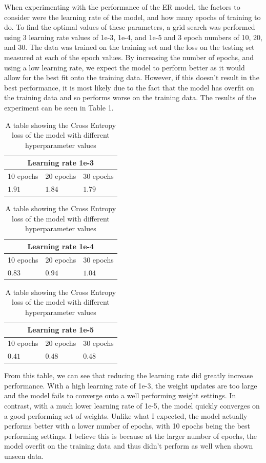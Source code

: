\documentclass[11pt]{article}
\begin{document}
When experimenting with the performance of the ER model, the factors to consider were the learning rate of the model, and how many epochs of training to do. To find the optimal values of these parameters, a grid search was performed using 3 learning rate values of 1e-3, 1e-4, and 1e-5 and 3 epoch numbers of 10, 20, and 30. The data was trained on the training set and the loss on the testing set measured at each of the epoch values. By increasing the number of epochs, and using a low learning rate, we expect the model to perform better as it would allow for the best fit onto the training data. However, if this doesn't result in the best performance, it is most likely due to the fact that the model has overfit on the training data and so performs worse on the training data. The results of the experiment can be seen in Table 1.

\begin{table}[H]
    \centering
    \caption{A table showing the Cross Entropy loss of the model with different hyperparameter values}
    \begin{tabularx}{0.48\textwidth}{|X X X|} 
      \hline
      \multicolumn{3}{|c|}{Learning rate 1e-3} \\ \hline 
      10 epochs & 20 epochs & 30 epochs \\ \hline
      $1.91$&$1.84$ &$1.79$ \\ \hline
    \end{tabularx}
    \begin{tabularx}{0.48\textwidth}{|X X X|} 
        \hline
        \multicolumn{3}{|c|}{Learning rate 1e-4} \\ \hline 
        10 epochs & 20 epochs & 30 epochs \\ \hline
        $0.83$&$0.94$ &$1.04$ \\ \hline
      \end{tabularx}
      \begin{tabularx}{0.48\textwidth}{|X X X|} 
        \hline
        \multicolumn{3}{|c|}{Learning rate 1e-5} \\ \hline 
        10 epochs & 20 epochs & 30 epochs \\ \hline
        $0.41$&$0.48$ &$0.48$ \\ \hline
    \end{tabularx}
\end{table}

From this table, we can see that reducing the learning rate did greatly increase performance. With a high learning rate of 1e-3, the weight updates are too large and the model fails to converge onto a well performing weight settings. In contrast, with a much lower learning rate of 1e-5, the model quickly converges on a good performing set of weights. Unlike what I expected, the model actually performs better with a lower number of epochs, with 10 epochs being the best performing settings. I believe this is because at the larger number of epochs, the model overfit on the training data and thus didn't perform as well when shown unseen data.
\end{document}

